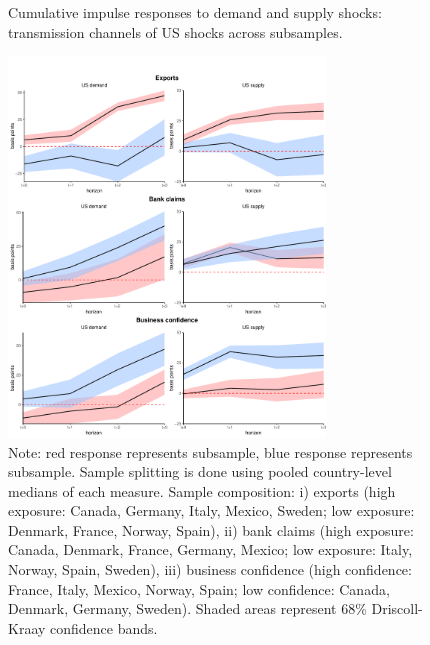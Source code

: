 \documentclass[12pt, a4paper]{article}
\begin{document}
\begin{figure}[H]
    \centering    
    \caption{Cumulative impulse responses to demand and supply shocks: transmission channels of US shocks across subsamples.}    
    \label{fig:demand_supply_channels}
    \includegraphics[width=0.75\textwidth]{Figures/high_low_LP_channels_US.pdf}
   \centering \caption*{Note: red response represents  subsample, blue response represents  subsample. Sample splitting is done using pooled country-level medians of each measure. Sample composition: i) exports (high exposure: Canada, Germany, Italy, Mexico, Sweden; low exposure: Denmark, France, Norway, Spain), ii) bank claims (high exposure: Canada, Denmark, France, Germany, Mexico; low exposure: Italy, Norway, Spain, Sweden), iii) business confidence (high confidence: France, Italy, Mexico, Norway, Spain; low confidence: Canada, Denmark, Germany, Sweden). Shaded areas represent 68\% Driscoll-Kraay confidence bands.}
\end{figure}

\end{document}
